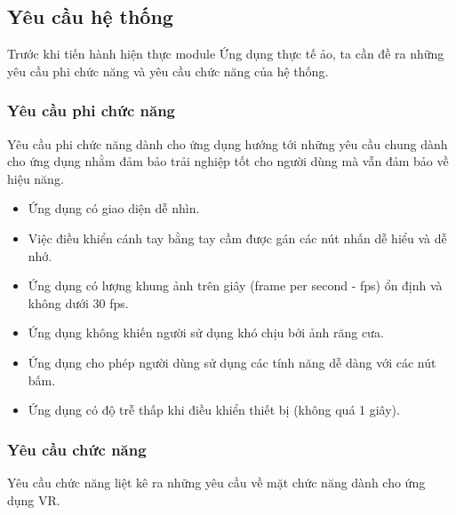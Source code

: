 \subsection{Yêu cầu hệ thống}

Trước khi tiến hành hiện thực module Ứng dụng thực tế ảo, ta cần đề ra những yêu cầu phi chức năng và yêu cầu chức năng của hệ thống.

\subsubsection{Yêu cầu phi chức năng}

Yêu cầu phi chức năng dành cho ứng dụng hướng tới những yêu cầu chung dành cho ứng dụng nhằm đảm bảo trải nghiệp tốt cho người dùng mà vẫn đảm bảo về hiệu năng.

\begin{itemize}
    \item Ứng dụng có giao diện dễ nhìn.
    \item Việc điều khiển cánh tay bằng tay cầm được gán các nút nhấn dễ hiểu và dễ nhớ.
    \item Ứng dụng có lượng khung ảnh trên giây (frame per second - fps) ổn định và không dưới 30 fps.
    \item Ứng dụng không khiến người sử dụng khó chịu bởi ảnh răng cưa.
    \item Ứng dụng cho phép người dùng sử dụng các tính năng dễ dàng với các nút bấm.
    \item Ứng dụng có độ trễ thấp khi điều khiển thiết bị (không quá 1 giây).
\end{itemize}

\subsubsection{Yêu cầu chức năng}

Yêu cầu chức năng liệt kê ra những yêu cầu về mặt chức năng dành cho ứng dụng VR.

